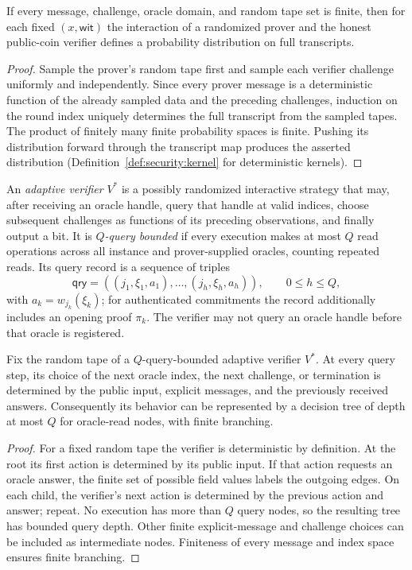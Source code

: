 \begin{lemma}\label{lem:security:finite-transcript}
If every message, challenge, oracle domain, and random tape set is finite, then for each fixed $(x,\mathsf{wit})$ the interaction of a randomized prover and the honest public-coin verifier defines a probability distribution on full transcripts.
\end{lemma}
\begin{proof}
Sample the prover's random tape first and sample each verifier challenge uniformly and independently. Since every prover message is a deterministic function of the already sampled data and the preceding challenges, induction on the round index uniquely determines the full transcript from the sampled tapes. The product of finitely many finite probability spaces is finite. Pushing its distribution forward through the transcript map produces the asserted distribution (Definition~\ref{def:security:kernel} for deterministic kernels).
\end{proof}

\begin{definition}\label{def:security:adaptive}
An \emph{adaptive verifier} $V^*$ is a possibly randomized interactive strategy that may, after receiving an oracle handle, query that handle at valid indices, choose subsequent challenges as functions of its preceding observations, and finally output a bit. It is \emph{$Q$-query bounded} if every execution makes at most $Q$ read operations across all instance and prover-supplied oracles, counting repeated reads. Its query record is a sequence of triples
\[
 \mathsf{qry}=((j_1,\xi_1,a_1),\ldots,(j_h,\xi_h,a_h)),\qquad 0\leq h\leq Q,
\]
with $a_k=w_{j_k}(\xi_k)$; for authenticated commitments the record additionally includes an opening proof $\pi_k$. The verifier may not query an oracle handle before that oracle is registered.
\end{definition}

\begin{lemma}\label{lem:security:decision-tree}
Fix the random tape of a $Q$-query-bounded adaptive verifier $V^*$. At every query step, its choice of the next oracle index, the next challenge, or termination is determined by the public input, explicit messages, and the previously received answers. Consequently its behavior can be represented by a decision tree of depth at most $Q$ for oracle-read nodes, with finite branching.
\end{lemma}
\begin{proof}
For a fixed random tape the verifier is deterministic by definition. At the root its first action is determined by its public input. If that action requests an oracle answer, the finite set of possible field values labels the outgoing edges. On each child, the verifier's next action is determined by the previous action and answer; repeat. No execution has more than $Q$ query nodes, so the resulting tree has bounded query depth. Other finite explicit-message and challenge choices can be included as intermediate nodes. Finiteness of every message and index space ensures finite branching.
\end{proof}

